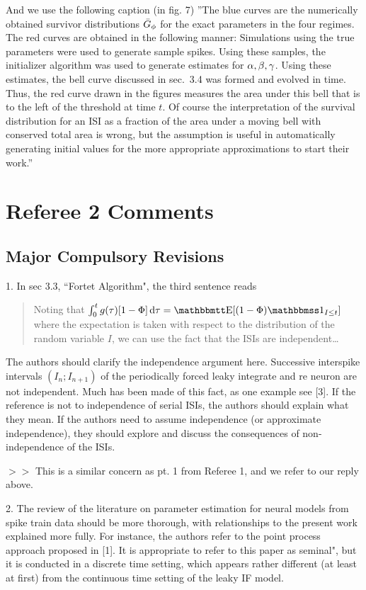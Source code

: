 \documentclass{article}
\begin{document}
And we use the following caption (in fig. 7) ''The blue curves are the
numerically obtained survivor  distributions ${ \bar{G} }_\phi$ for the exact parameters
in the four regimes. The red  curves are obtained in the following manner:
Simulations using the true  parameters were used to generate sample spikes.
Using these samples, the initializer algorithm was used to generate estimates
for ${\alpha},{\beta},{\gamma }$. Using these estimates, the bell curve discussed in sec.\ 3.4 was
formed and evolved in time. Thus, the red curve drawn in the figures measures
the area under this bell that is to the left of the threshold at time $t$.  Of
course the interpretation of the survival distribution for an ISI as a fraction
of the area under a moving bell with conserved total area is wrong, but the
assumption is useful in automatically generating initial values for the more
appropriate approximations to start their work.''

\clearpage

\section{Referee 2 Comments}
\subsection{Major Compulsory Revisions}
1. In sec 3.3, ``Fortet Algorithm", the third sentence reads
\begin{quote}
Noting that
$\int_0^t g (\tau) [1-\F ] \intd{\tau} = \Exp[ (1 - \F ) \charf_{I \leq t} ]$ where
the expectation is taken with respect to the distribution of the random variable
$I$, we can use the fact that the ISIs are independent\ldots
\end{quote}
The authors should clarify the independence argument here.
Successive interspike intervals $(I_n; I_{n+1})$ of the periodically forced
leaky integrate and  re neuron are not independent. Much has been made of this fact,
as one example see [3]. If the reference is not to independence of serial
ISIs, the authors should explain what they mean. If the authors need to assume
independence (or approximate independence), they should explore and discuss
the consequences of non-independence of the ISIs.

$>>$ This is a similar concern as pt. 1 from Referee 1, and we refer to
our reply above.

\vskip 10pt
2. The review of the literature on parameter estimation for neural models from spike train data
should be more thorough, with relationships to the present work explained more fully. For
instance, the authors refer to the point process approach proposed in [1]. It is appropriate to
refer to this paper as seminal", but it is conducted in a discrete time setting, which appears
rather different (at least at first) from the continuous time setting of the
leaky IF model.
\end{document}
